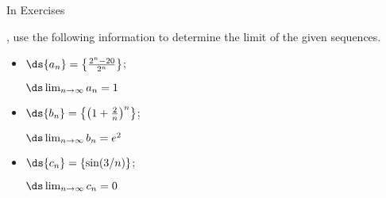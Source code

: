 \begin{exerciseset}{In Exercises}{, use the following information to determine the limit of the given sequences.

\begin{itemize}
\item	\parbox{90pt}{$\ds \{a_n\} = \left\{\frac{2^n-20}{2^n}\right\}$;}\quad $\ds \lim_{n\to\infty} a_n = 1$
\item	\parbox{90pt}{$\ds \{b_n\} = \left\{\left(1+\frac{2}{n}\right)^n\right\}$;}\quad $\ds \lim_{n\to\infty} b_n = e^2$
\item	\parbox{90pt}{$\ds \{c_n\} = \left\{\sin (3/n)\right\}$;}\quad $\ds \lim_{n\to\infty} c_n = 0$
\end{itemize}}





\end{exerciseset}
